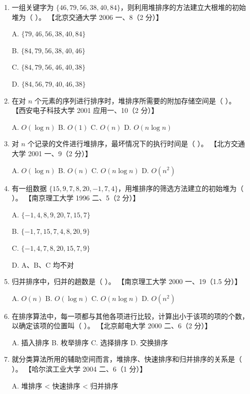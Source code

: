 \documentclass[lang=cn,newtx,10pt,scheme=chinese]{../../elegantbook}
\begin{document}
\begin{enumerate}
    \item 一组关键字为 $\{46, 79, 56, 38, 40, 84\}$，则利用堆排序的方法建立大根堆的初始堆为（ ）。  
    【北京交通大学 2006 一、8（2 分）】  

    A. $\{79, 46, 56, 38, 40, 84\}$  

    B. $\{84, 79, 56, 38, 40, 46\}$  

    C. $\{84, 79, 56, 46, 40, 38\}$  

    D. $\{84, 56, 79, 40, 46, 38\}$  

    \item 在对 $n$ 个元素的序列进行排序时，堆排序所需要的附加存储空间是（ ）。  
    【西安电子科技大学 2001 应用一、10（2 分）】  

    A. $O(\log n)$ \quad B. $O(1)$ \quad C. $O(n)$ \quad D. $O(n \log n)$  

    \item 对 $n$ 个记录的文件进行堆排序，最坏情况下的执行时间是（ ）。  
    【北方交通大学 2001 一、9（2 分）】  

    A. $O(\log n)$ \quad B. $O(n)$ \quad C. $O(n \log n)$ \quad D. $O(n^2)$  

    \item 有一组数据 $\{15, 9, 7, 8, 20, -1, 7, 4\}$，用堆排序的筛选方法建立的初始堆为（ ）。  
    【南京理工大学 1996 二、5（2 分）】  

    A. $\{-1, 4, 8, 9, 20, 7, 15, 7\}$  

    B. $\{-1, 7, 15, 7, 4, 8, 20, 9\}$  

    C. $\{-1,4,7,8,20,15,7,9\}$  

    D. A、B、C 均不对  

    \item 归并排序中，归并的趟数是（ ）。  
    【南京理工大学 2000 一、19（1.5 分）】  

    A. $O(n)$ \quad B. $O(\log n)$ \quad C. $O(n \log n)$ \quad D. $O(n^2)$  

    \item 在排序算法中，每一项都与其他各项进行比较，计算出小于该项的项的个数，以确定该项的位置叫（ ）。  
    【北京邮电大学 2000 二、6（2 分）】  

    A. 插入排序 \quad B. 枚举排序 \quad C. 选择排序 \quad D. 交换排序  

    \item 就分类算法所用的辅助空间而言，堆排序、快速排序和归并排序的关系是（ ）。  
    【哈尔滨工业大学 2004 二、6（1 分）】 

    A. 堆排序 < 快速排序 < 归并排序  


\end{enumerate}
\end{document}
